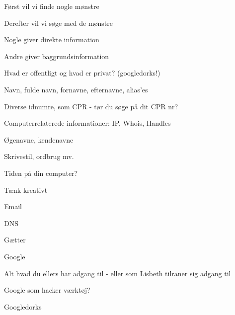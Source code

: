 \documentclass[Screen16to9,17pt]{foils}
\begin{document}

\begin{list1}
\item Først vil vi finde nogle mønstre
\item Derefter vil vi søge med de mønstre
\item Nogle giver direkte information
\item Andre giver baggrundsinformation
\item Hvad er offentligt og hvad er privat? (googledorks!)
\end{list1}


\begin{list1}
\item Navn, fulde navn, fornavne, efternavne, alias'es
\item Diverse idnumre, som CPR - tør du søge på dit CPR nr?
\item Computerrelaterede informationer: IP, Whois, Handles
\item Øgenavne, kendenavne
\item Skrivestil, ordbrug mv.
\item Tiden på din computer?
\item Tænk kreativt \smiley
\end{list1}



\begin{list1}
\item Email
\item DNS
\item Gætter
\item Google
\item Alt hvad du ellers har adgang til - eller som Lisbeth tilraner sig adgang til
\end{list1}




\begin{list1}
\item Google som hacker værktøj?
\item Googledorks
\end{list1}


\myquestionspage


\end{document}
